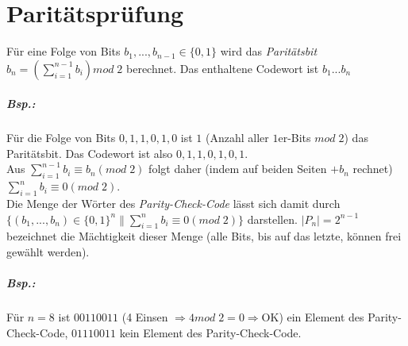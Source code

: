 \section{Paritätsprüfung}
Für eine Folge von Bits $b_1,...,b_{n-1}\in \{0,1\}$ wird das \emph{Paritätsbit} $b_n= \left( \sum_{i=1}^{n-1}b_i\right) mod \; 2$ berechnet. Das enthaltene Codewort ist $b_1...b_n$
\subparagraph{Bsp.:} Für die Folge von Bits $0,1,1,0,1,0$ ist $1$ (Anzahl aller $1$er-Bits $mod\;2$) das Paritätsbit. Das Codewort ist also $0,1,1,0,1,0,1$.\medskip\\
Aus $\sum_{i=1}^{n-1}b_i\equiv b_n (mod\; 2)$ folgt daher (indem auf beiden Seiten $+b_n$ rechnet) $\sum_{i=1}^{n}b_i \equiv 0 (mod\;2)$.\\
Die Menge der Wörter des \emph{Parity-Check-Code} lässt sich damit durch $\{(b_1,...,b_n)\in \{0,1\}^n\|\sum_{i=1}^{n}b_i\equiv 0 (mod\; 2)\}$ darstellen. $|P_n|=2^{n-1}$ bezeichnet die Mächtigkeit dieser Menge (alle Bits, bis auf das letzte, können frei gewählt werden).
\subparagraph{Bsp.:} Für $n=8$ ist $00110011$ (4 Einsen $\Rightarrow 4mod \;2=0 \Rightarrow$OK) ein Element des Parity-Check-Code, $01110011$ kein Element des Parity-Check-Code.\\
